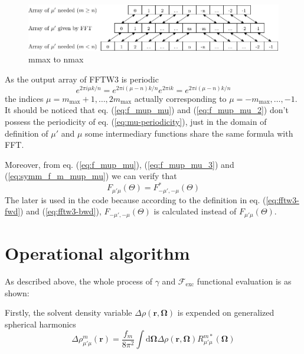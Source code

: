 \begin{figure}[h]
\centering{}%
\begin{minipage}[t]{1\textwidth}%
\begin{center}
\includegraphics[width=1\textwidth]{_figure/mmax_to_nmax}
\par\end{center}

\caption[mmax to nmax]{mmax to nmax\label{fig:FFTW3-2D-mmax_to_nmax}}
%
\end{minipage}
\end{figure}


As the output array of FFTW3 is periodic
\begin{equation}
e^{2\pi i\mu k/n}=e^{2\pi i(\mu-n)k/n}e^{2\pi ik}=e^{2\pi i(\mu-n)k/n}\label{eq:mu-periodicity}
\end{equation}
the indices $\mu=m_{\mathrm{max}}+1,\ldots,2m_{\mathrm{max}}$ actually
corresponding to $\mu=-m_{\mathrm{max}},\ldots,-1$. It should be
noticed that eq. (\ref{eq:f_mup_mu}) and (\ref{eq:f_mup_mu_2}) don't
possess the periodicity of eq. (\ref{eq:mu-periodicity}), just in
the domain of definition of $\mu'$ and $\mu$ some intermediary functions
share the same formula with FFT.

Moreover, from eq. (\ref{eq:f_mup_mu}), (\ref{eq:f_mup_mu_3}) and
(\ref{eq:symm_f_m_mup_mu}) we can verify that
\begin{equation}
F_{\mu'\mu}(\Theta)=F_{-\mu',-\mu}^{*}(\Theta)
\end{equation}
The later is used in the code because according to the definition
in eq. (\ref{eq:fftw3-fwd}) and (\ref{eq:fftw3-bwd}), $F_{-\mu',-\mu}(\Theta)$
is calculated instead of $F_{\mu'\mu}(\Theta)$.


\section{Operational algorithm\label{sec:Operational-algorithm}}

As described above, the whole process of $\gamma$ and $\mathcal{F}_{\mathrm{exc}}$
functional evaluation is as shown: 

Firstly, the solvent density variable $\Delta\rho(\mathbf{r},\mathbf{\Omega})$
is expended on generalized spherical harmonics
\begin{equation}
\Delta\rho_{\mu'\mu}^{m}(\mathbf{r})=\frac{f_{m}}{8\pi^{2}}\int\mathrm{d}\mathbf{\Omega}\Delta\rho(\mathbf{r},\mathbf{\Omega})R_{\mu'\mu}^{m*}(\mathbf{\Omega})\label{eq:fgsht-fwd}
\end{equation}


